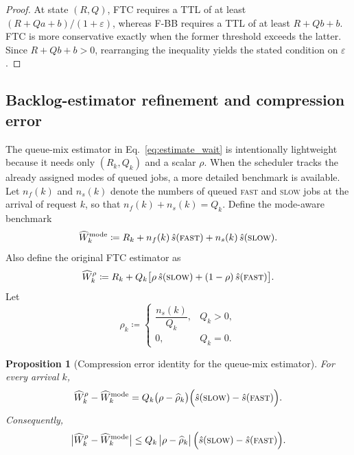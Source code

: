 \documentclass[fleqn,12pt,lineno]{wlpeerj}
\newtheorem{proposition}[theorem]{Proposition}
\begin{document}
\begin{proof}
At state $(R,Q)$, FTC requires a TTL of at least $(R+Qa+b)/(1+\varepsilon)$, whereas F-BB requires a TTL of at least $R+Qb+b$. FTC is more conservative exactly when the former threshold exceeds the latter. Since $R+Qb+b>0$, rearranging the inequality yields the stated condition on $\varepsilon$.
\end{proof}

\subsection{Backlog-estimator refinement and compression error}
\label{sec:ftc_estimator_refinement}

The queue-mix estimator in Eq.~\eqref{eq:estimate_wait} is intentionally lightweight because it needs only $(R_k,Q_k)$ and a scalar $\rho$. When the scheduler tracks the already assigned modes of queued jobs, a more detailed benchmark is available. Let $n_f(k)$ and $n_s(k)$ denote the numbers of queued \textsc{fast} and \textsc{slow} jobs at the arrival of request $k$, so that $n_f(k)+n_s(k)=Q_k$. Define the mode-aware benchmark
\[
\widehat W_k^{\mathrm{mode}}
\coloneqq R_k + n_f(k)\,\hat{s}(\textsc{fast}) + n_s(k)\,\hat{s}(\textsc{slow}).
\]
Also define the original FTC estimator as
\[
\widehat W_k^{\rho}
\coloneqq R_k + Q_k\bigl[\rho\,\hat{s}(\textsc{slow}) + (1-\rho)\,\hat{s}(\textsc{fast})\bigr].
\]
Let
\[
\widehat\rho_k \coloneqq
\begin{cases}
\dfrac{n_s(k)}{Q_k}, & Q_k>0,\\[6pt]
0, & Q_k=0.
\end{cases}
\]

\begin{proposition}[Compression error identity for the queue-mix estimator]
\label{prop:compression_error}
For every arrival $k$,
\[
\widehat W_k^{\rho} - \widehat W_k^{\mathrm{mode}}
= Q_k\bigl(\rho-\widehat\rho_k\bigr)\Bigl(\hat{s}(\textsc{slow})-\hat{s}(\textsc{fast})\Bigr).
\]
Consequently,
\[
\bigl|\widehat W_k^{\rho} - \widehat W_k^{\mathrm{mode}}\bigr|
\le Q_k\,\bigl|\rho-\widehat\rho_k\bigr|\,\Bigl(\hat{s}(\textsc{slow})-\hat{s}(\textsc{fast})\Bigr).
\]
\end{proposition}
\end{document}
